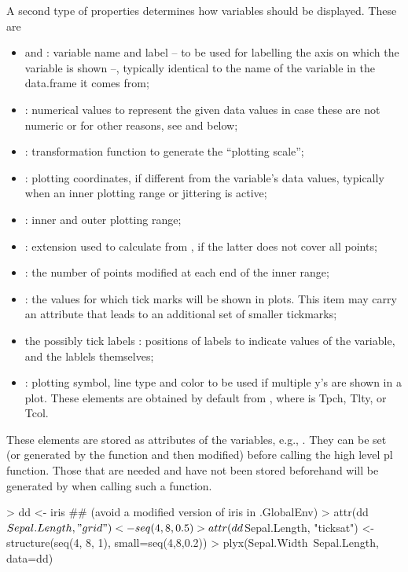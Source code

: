 \documentclass[11pt]{article}
\begin{document}
A second type of properties determines how variables should be displayed.
These are
\begin{itemize}
\item
   and : variable name and label --  
  to be used for labelling the axis on which the variable is shown --, 
  typically identical to the name of the variable
  in the data.frame it comes from;
\item
  : numerical values to represent the given data values in
  case these are not numeric or for other reasons, see  and
   below;
\item
  : transformation function to generate the ``plotting scale'';    
\item
  : plotting coordinates, if different from the variable's data
  values, typically when an inner plotting range or jittering is active;
\item
  : inner and outer plotting range;
\item
  : extension used to calculate 
  from , if the latter does not cover all points;
\item 
  : the number of points modified at each end of the inner range;
\item
  : the values for which tick marks will be shown in plots.
  This item may carry an attribute  that leads to an additional
  set of smaller tickmarks;
\item
   the possibly tick labels :
  positions of labels to indicate values of the variable, and the lablels
  themselves;
\item
  : plotting symbol, line type and color to be used 
  if multiple y's are shown in a plot.
  These elements are obtained by default from
  , where  is T{pch}, T{lty}, or
  T{col}.
\end{itemize}
These elements are stored as attributes of the variables,
e.g., .
They can be set (or generated by the function  and 
then modified) before calling the high level pl function.
Those that are needed and have not been stored beforehand will be 
generated by  when calling such a function.
\begin{Schunk}
\begin{Sinput}
> dd <- iris ## (avoid a modified version of  iris  in .GlobalEnv)
> attr(dd$Sepal.Length, "grid") <- seq(4,8,0.5)
> attr(dd$Sepal.Length, "ticksat") <- structure(seq(4, 8, 1), small=seq(4,8,0.2))
> plyx(Sepal.Width~Sepal.Length, data=dd)
\end{Sinput}
\end{Schunk}
\end{document}
